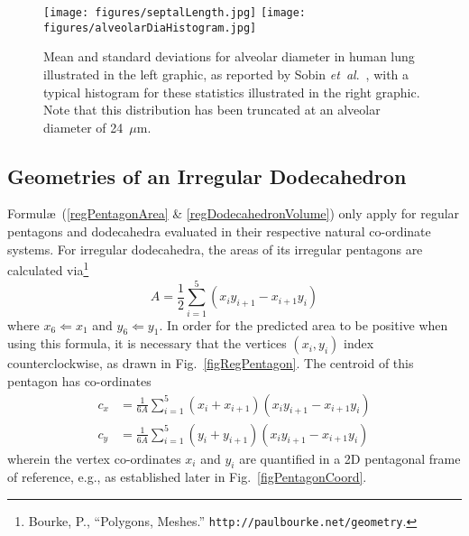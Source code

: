 \begin{figure}
	\centering
	\texttt{[image: figures/septalLength.jpg]}
    \texttt{[image: figures/alveolarDiaHistogram.jpg]}
	\caption{Mean and standard deviations for alveolar diameter in human lung illustrated in the left graphic, as reported by Sobin \textit{et~al}.\ \cite{Sobinetal88}, with a typical histogram for these statistics illustrated in the right graphic.  Note that this distribution has been truncated at an alveolar diameter of 24~$\mu$m.}
	\label{septalLengthFig}
\end{figure}

\subsection{Geometries of an Irregular Dodecahedron}
\label{sec:geometries}

Formul\ae\ (\ref{regPentagonArea} \& \ref{regDodecahedronVolume}) only apply for regular pentagons and dodecahedra evaluated in their respective natural co-ordinate systems.  For irregular dodecahedra, the areas of its irregular pentagons are calculated via\footnote{
	Bourke, P., ``Polygons, Meshes.'' \texttt{http://paulbourke.net/geometry}.
}
\begin{equation}
	A = \frac{1}{2} \sum_{i=1}^5 ( x_i y_{i+1} - x_{i+1} y_i)
	\label{irregularPentagonArea}
\end{equation}
where $x_6 \Leftarrow x_1$ and $y_6 \Leftarrow y_1$.  In order for the predicted area to be positive when using this formula, it is necessary that the vertices $(x_i , y_i)$ index counterclockwise, as drawn in Fig.~\ref{figRegPentagon}.  The centroid of this pentagon has co-ordinates\footnotemark[\value{footnote}]
\begin{subequations}
	\label{centroidPentagon}
	\begin{align}
		c_x & = \frac{1}{6 A} \sum_{i=1}^5 (x_i + x_{i+1})
			( x_i y_{i+1} - x_{i+1} y_i) \\
		c_y & = \frac{1}{6 A} \sum_{i=1}^5 (y_i + y_{i+1})
		( x_i y_{i+1} - x_{i+1} y_i)
	\end{align}
\end{subequations}
wherein the vertex co-ordinates $x_i$ and $y_i$ are quantified in a 2D pentagonal frame of reference, e.g., as established later in Fig.~\ref{figPentagonCoord}.

